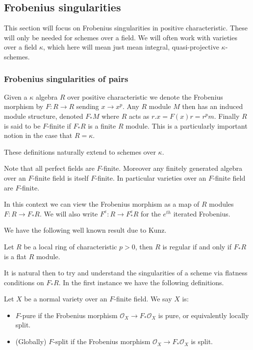 \documentclass[a4paper,12pt]{book}
\newcommand{\ox}{\mathcal{O}_{X}}
\begin{document}
\subsection{Frobenius singularities}

This section will focus on Frobenius singularities in positive characteristic. These will only be needed for schemes over a field. We will often work with varieties over a field $\kappa$, which here will mean just mean integral, quasi-projective $\kappa$-schemes.

\subsubsection{Frobenius singularities of pairs}

\begin{definition}
Given a $\kappa$ algebra $R$ over positive characteristic we denote the Frobenius morphism by $F:R\to R$ sending $x \to x^{p}$. Any $R$ module $M$ then has an induced module structure, denoted $F_{*}M$ where $R$ acts as $r.x=F(x)r=r^{p}m$. Finally $R$ is said to be $F$-finite if $F_{*}R$ is a finite $R$ module. This is a particularly important notion in the case that $R=\kappa$.

These definitions naturally extend to schemes over $\kappa$. 
\end{definition}

Note that all perfect fields are $F$-finite. Moreover any finitely generated algebra over an $F$-finite field is itself $F$-finite. In particular varieties over an $F$-finite field are $F$-finite.

In this context we can view the Frobenius morphism as a map of $R$ modules $F:R \to F_{*}R$. We will also write $F^{e}:R \to F_{*}^{e}R$ for the $e^{th}$ iterated Frobenius.

We have the following well known result due to Kunz.

\begin{theorem}
	Let $R$ be a local ring of characteristic $p> 0$, then $R$ is regular if and only if $F_{*}R$ is a flat $R$ module.
\end{theorem}

It is natural then to try and understand the singularities of a scheme via flatness conditions on $F_{*}R$. In the first instance we have the following definitions.

\begin{definition}
	Let $X$ be a normal variety over an $F$-finite field.
	We say $X$ is:
	\begin{itemize}
		\item $F$-pure if the Frobenius morphism $\ox \to F_{*}\ox$ is pure, or equivalently locally split.
		\item (Globally) $F$-split if the Frobenius morphism $\ox \to F_{*}\ox$ is split.
	\end{itemize} 
\end{definition}
\end{document}
